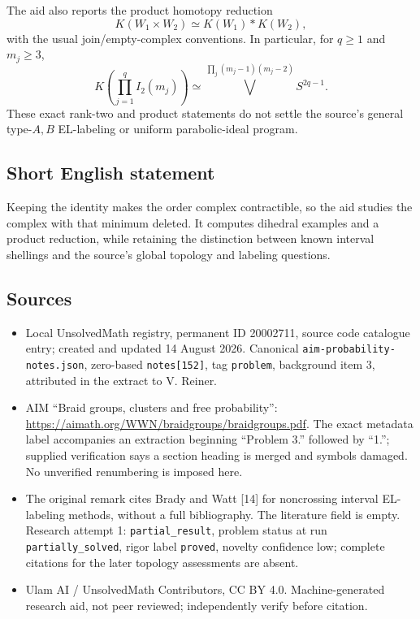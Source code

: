 \documentclass[11pt]{article}
\begin{document}
The aid also reports the product homotopy reduction
\[
 K(W_1\times W_2)\simeq K(W_1)*K(W_2),
\]
with the usual join/empty-complex conventions. In particular, for $q\ge1$ and $m_j\ge3$,
\[
 K\!\left(\prod_{j=1}^qI_2(m_j)\right)
 \simeq\bigvee^{\prod_j(m_j-1)(m_j-2)}S^{2q-1}.
\]
These exact rank-two and product statements do not settle the source's general type-$A,B$ EL-labeling or uniform parabolic-ideal program.
\subsection{Short English statement}
Keeping the identity makes the order complex contractible, so the aid studies the complex with that minimum deleted. It computes dihedral examples and a product reduction, while retaining the distinction between known interval shellings and the source's global topology and labeling questions.
\subsection{Sources}
\begin{itemize}
\item Local UnsolvedMath registry, permanent ID 20002711, source code catalogue entry; created and updated 14 August 2026. Canonical \texttt{aim-probability-notes.json}, zero-based \texttt{notes[152]}, tag \texttt{problem}, background item 3, attributed in the extract to V. Reiner.
\item AIM ``Braid groups, clusters and free probability'': \url{https://aimath.org/WWN/braidgroups/braidgroups.pdf}. The exact metadata label accompanies an extraction beginning ``Problem 3.'' followed by ``1.''; supplied verification says a section heading is merged and symbols damaged. No unverified renumbering is imposed here.
\item The original remark cites Brady and Watt [14] for noncrossing interval EL-labeling methods, without a full bibliography. The literature field is empty. Research attempt 1: \texttt{partial\_result}, problem status at run \texttt{partially\_solved}, rigor label \texttt{proved}, novelty confidence low; complete citations for the later topology assessments are absent.
\item Ulam AI / UnsolvedMath Contributors, CC BY 4.0. Machine-generated research aid, not peer reviewed; independently verify before citation.
\end{itemize}
\end{document}
